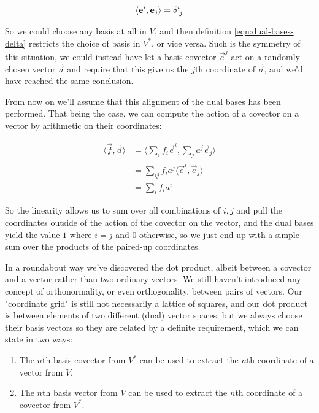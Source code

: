 \begin{equation}
    \langle \vec{e}^i,\vec{e}_j\rangle = \delta\indices{^i_j}
    \label{eqn:dual-bases-delta}
\end{equation}

So we could choose any basis at all in $V$, and then definition \eqref{eqn:dual-bases-delta} restricts the choice of basis in $V^*$, or vice versa. Such is the symmetry of this situation, we could instead have let a basis covector $\vec{e}^j$ act on a randomly chosen vector $\vec{a}$ and require that this give us the $j$th coordinate of $\vec{a}$, and we'd have reached the same conclusion.

From now on we'll assume that this alignment of the dual bases has been performed. That being the case, we can compute the action of a covector on a vector by arithmetic on their coordinates:

\begin{equation}
    \begin{split}
        \langle \vec{f},\vec{a}\rangle 
        &= \langle \sum_i f_i \vec{e}^i , \sum_j a^j \vec{e}_j \rangle \\
        &= \sum_{ij} f_i a^j \langle\vec{e}^i,\vec{e}_j\rangle \\
        &= \sum_{i} f_i a^i
    \end{split}
\end{equation}

So the linearity allows us to sum over all combinations of $i, j$ and pull the coordinates outside of the action of the covector on the vector, and the dual bases yield the value $1$ where $i = j$ and $0$ otherwise, so we just end up with a simple sum over the products of the paired-up coordinates.

In a roundabout way we've discovered the dot product, albeit between a covector and a vector rather than two ordinary vectors. We still haven't introduced any concept of orthonormality, or even orthogonality, between pairs of vectors. Our "coordinate grid" is still not necessarily a lattice of squares, and our dot product is between elements of two different (dual) vector spaces, but we always choose their basis vectors so they are related by a definite requirement, which we can state in two ways:

\begin{enumerate}
    \item The $n$th basis covector from $V^*$ can be used to extract the $n$th coordinate of a vector from $V$.
    \item The $n$th basis vector from $V$ can be used to extract the $n$th coordinate of a covector from $V^*$.
\end{enumerate}

